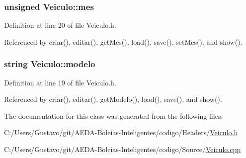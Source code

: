 \hypertarget{class_veiculo_ac4146f7b3d38e31e3225074e0fb0dea9}{
\subsubsection[{mes}]{\setlength{\rightskip}{0pt plus 5cm}unsigned Veiculo\+::mes\hspace{0.3cm}{\ttfamily [private]}}}\label{class_veiculo_ac4146f7b3d38e31e3225074e0fb0dea9}


Definition at line 20 of file Veiculo.\+h.



Referenced by criar(), editar(), get\+Mes(), load(), save(), set\+Mes(), and show().

\hypertarget{class_veiculo_a313c15811b7fffa4787eea0dcf12fc13}{
\subsubsection[{modelo}]{\setlength{\rightskip}{0pt plus 5cm}string Veiculo\+::modelo\hspace{0.3cm}{\ttfamily [private]}}}\label{class_veiculo_a313c15811b7fffa4787eea0dcf12fc13}


Definition at line 19 of file Veiculo.\+h.



Referenced by criar(), editar(), get\+Modelo(), load(), save(), and show().



The documentation for this class was generated from the following files\+:\begin{DoxyCompactItemize}
\item 
C\+:/\+Users/\+Gustavo/git/\+A\+E\+D\+A-\/\+Boleias-\/\+Inteligentes/codigo/\+Headers/\hyperlink{_veiculo_8h}{Veiculo.\+h}\item 
C\+:/\+Users/\+Gustavo/git/\+A\+E\+D\+A-\/\+Boleias-\/\+Inteligentes/codigo/\+Source/\hyperlink{_veiculo_8cpp}{Veiculo.\+cpp}\end{DoxyCompactItemize}
